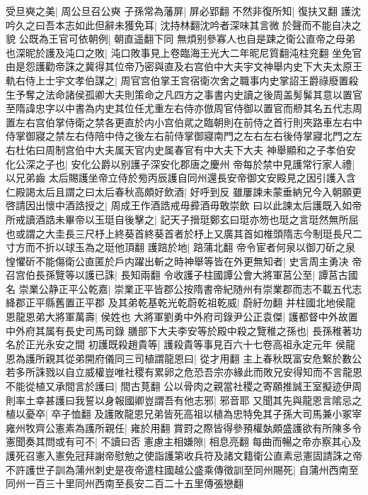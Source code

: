 受旦奭之美|{
	周公旦召公奭}
子孫常為藩屏|{
	屏必郢翻}
不然非復所知|{
	復扶又翻}
護沈吟久之曰吾本志如此但辭未獲免耳|{
	沈持林翻沈吟者深味其言微於聲而不能自决之貌}
公既為王官可依朝例|{
	朝直遥翻下同}
無煩别參寡人也自是踈之衛公直帝之母弟也深昵於護及沌口之敗|{
	沌口敗事見上卷臨海王光大二年昵尼質翻沌柱兖翻}
坐免官由是怨護勸帝誅之冀得其位帝乃密與直及右宫伯中大夫宇文神舉内史下大夫太原王軌右侍上士宇文孝伯謀之|{
	周官宫伯掌王宫宿衛次舍之職事内史掌詔王爵祿廢置殺生予奪之法命諸侯孤卿大夫則策命之凡四方之事書内史讀之後周盖髣髴其意以置官至隋諱忠字以中書為内史其位任尤重左右侍亦倣周官侍御以置官而剙其名五代志周置左右宫伯掌侍衛之禁各更直於内小宫伯貮之臨朝則在前侍之首行則夾路車左右中侍掌御寢之禁左右侍陪中侍之後左右前侍掌御寢南門之左右左右後侍掌寢北門之左右杜佑曰周制宫伯中大夫属天官内史属春官有中大夫下大夫}
神舉顯和之子孝伯安化公深之子也|{
	安化公爵以别護子深安化郡唐之慶州}
帝每於禁中見護常行家人禮|{
	以兄弟齒}
太后賜護坐帝立侍於㫄丙辰護自同州還長安帝御文安殿見之因引護入含仁殿謁太后且謂之曰太后春秋高頗好飲酒|{
	好呼到反}
雖屢諫未蒙垂納兄今入朝願更啓請因出懷中酒誥授之|{
	周成王作酒誥戒毋彛酒毋敢崇飲}
曰以此諫太后護既入如帝所戒讀酒誥未畢帝以玉珽自後擊之|{
	記天子搢珽鄭玄曰珽亦笏也珽之言珽然無所屈也或謂之大圭長三尺杼上終葵首終葵首者於杼上又廣其首如椎頭隋志今制珽長尺二寸方而不折以球玉為之珽他頂翻}
護踣於地|{
	踣蒲北翻}
帝令宦者何泉以御刀斫之泉惶懼斫不能傷衛公直匿於戶内躍出斬之時神舉等皆在外更無知者|{
	史言周主勇决}
帝召宫伯長孫覽等以護已誅|{
	長知兩翻}
令收護子柱國譚公會大將軍莒公至|{
	譚莒古國名}
崇業公静正平公乾嘉|{
	崇業正平皆郡公按隋書帝紀随州有崇業郡而志不載五代志絳郡正平縣舊置正平郡}
及其弟乾基乾光乾蔚乾祖乾威|{
	蔚紆勿翻}
并柱國北地侯龍恩龍恩弟大將軍萬壽|{
	侯姓也}
大將軍劉勇中外府司錄尹公正袁傑|{
	護都督中外故置中外府其属有長史司馬司錄}
膳部下大夫李安等於殿中殺之覽稚之孫也|{
	長孫稚著功名於正光永安之間}
初護既殺趙貴等|{
	護殺貴等事見百六十七卷高祖永定元年}
侯龍恩為護所親其從弟開府儀同三司植謂龍恩曰|{
	從才用翻}
主上春秋既富安危繋於數公若多所誅戮以自立威權豈唯社稷有累卵之危恐吾宗亦緣此而敗兄安得知而不言龍恩不能從植又承間言於護曰|{
	間古莧翻}
公以骨肉之親當社稷之寄願推誠王室擬迹伊周則率土幸甚護曰我誓以身報國卿豈謂吾有他志邪|{
	邪音耶}
又聞其先與龍恩言隂忌之植以憂卒|{
	卒子恤翻}
及護敗龍恩兄弟皆死高祖以植為忠特免其子孫大司馬兼小冢宰雍州牧齊公憲素為護所親任|{
	雍於用翻}
賞罸之際皆得參預權埶頗盛護欲有所陳多令憲聞奏其問或有可不|{
	不讀曰否}
憲慮主相嫌隙|{
	相息亮翻}
每曲而暢之帝亦察其心及護死召憲入憲免冠拜謝帝慰勉之使詣護第收兵符及諸文籍衛公直素忌憲固請誅之帝不許護世子訓為蒲州刺史是夜帝遣柱國越公盛乘傳徵訓至同州賜死|{
	自蒲州西南至同州一百三十里同州西南至長安二百二十五里傳張戀翻}
